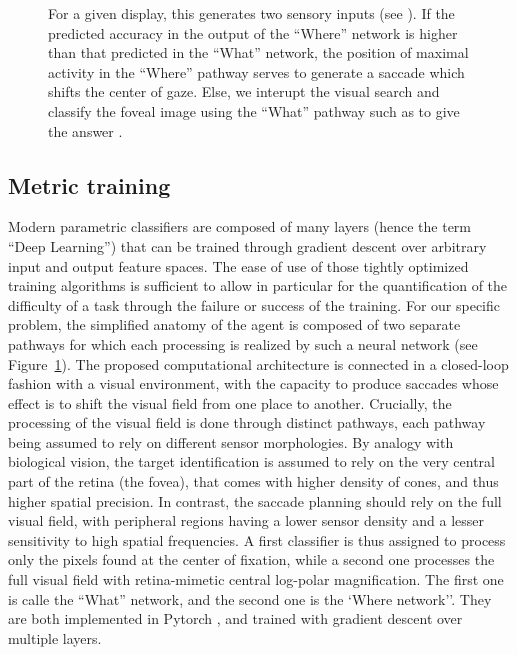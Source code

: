 \begin{figure}[t!]
{		\D
		For a given display, this generates two sensory inputs (see \B ).
		If the predicted accuracy in the output of the ``Where'' network is higher than that predicted in the ``What'' network, the position of maximal activity in the ``Where'' pathway serves to generate a saccade which shifts the center of gaze. Else, we interupt the visual search and classify the foveal image using the ``What'' pathway such as to give the answer \ANS . %
		\label{fig:methods}}%
\end{figure}%


\subsection*{Metric training}

Modern parametric classifiers are composed of many layers (hence the term ``Deep Learning'') that can be trained through gradient descent over arbitrary input and output feature spaces. The ease of use of those tightly optimized training algorithms is sufficient to allow in particular for the quantification of the difficulty of a task through the failure or success of the training.
For our specific problem, the simplified anatomy of the agent is composed of two separate pathways for which each processing is realized by such a neural network (see Figure~\ref{fig:methods}). The proposed computational architecture is connected in a closed-loop fashion with a visual environment, with the capacity to produce saccades whose effect is to shift the visual field from one place to another. Crucially, the processing of the visual field is done through distinct pathways,  each pathway being assumed to rely on different sensor morphologies. By analogy with biological vision, the target identification is assumed to rely on the very central part of the retina (the fovea), that comes with higher density of cones, and thus higher spatial precision. In contrast, the  saccade planning should rely on the full visual field, with peripheral regions having a lower sensor density and a lesser sensitivity to high spatial frequencies. A first classifier is thus assigned to process only the pixels found at the center of fixation, while a second one processes the full visual field with retina-mimetic central log-polar magnification.  The first one is calle the ``What'' network, and the second one is the `Where network''. They are both implemented in Pytorch \cite{NEURIPS2019_9015}, and trained with gradient descent over multiple layers. 

